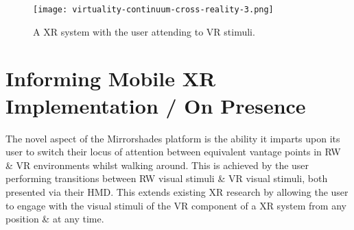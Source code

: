 \begin{figure}[h]
	\begin{center}
		\texttt{[image: virtuality-continuum-cross-reality-3.png]}
		\caption{A XR system with the user attending to VR stimuli.}
		\label{virtuality-continuum-cross-reality-3}
	\end{center}
\end{figure}



\section{Informing Mobile XR Implementation / On Presence}

\newcommand{\breakinpresencefootnote}{\footnote{The definition of \textbf{break in presence} adopted herein is the second from Waterworth \& Waterworth~\cite{Waterworth2001} (p205): a movement along the focus axis away from presence in the real or a virtual environment \& toward absence. This differs to Slater \& Steed's original definition in~\cite{Slater2000} as they considered presence only in terms of attending to stimuli from a virtual environment, with a break in presence as a Gestalt switch to instead attending to stimuli from the real environment. Waterworth \& Waterworth's model considers presence in terms of attending to stimuli from either the real \textit{or a virtual} environment, with a break in presence representing absence in the sense of heightened conceptual load \& the resultant reduced perceptual processing of environmental stimuli originating from \textit{either} the real or a virtual environment. This definition better fits the situation invoked by the Mirrorshades platform, which is concerned with intentionally \& willingly switching engagement between stimuli from both real \& virtual environments, rather than engaging with stimuli from only a virtual environment in a scenario where stimuli from the real environment are considered a `distraction'.}}

The novel aspect of the Mirrorshades platform is the ability it imparts upon its user to switch their locus of attention between equivalent vantage points in RW \& VR environments whilst walking around. This is achieved by the user performing transitions between RW visual stimuli \& VR visual stimuli, both presented via their HMD. This extends existing XR research by allowing the user to engage with the visual stimuli of the VR component of a XR system from any position \& at any time.

